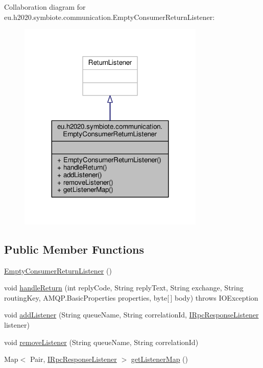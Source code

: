 Collaboration diagram for eu.\+h2020.\+symbiote.\+communication.\+Empty\+Consumer\+Return\+Listener\+:
\nopagebreak
\begin{figure}[H]
\begin{center}
\leavevmode
\includegraphics[width=251pt]{classeu_1_1h2020_1_1symbiote_1_1communication_1_1EmptyConsumerReturnListener__coll__graph}
\end{center}
\end{figure}
\subsection*{Public Member Functions}
\begin{DoxyCompactItemize}
\item 
\hyperlink{classeu_1_1h2020_1_1symbiote_1_1communication_1_1EmptyConsumerReturnListener_a9ec79d1d093e2380bf03fa1f76ce2261}{Empty\+Consumer\+Return\+Listener} ()
\item 
void \hyperlink{classeu_1_1h2020_1_1symbiote_1_1communication_1_1EmptyConsumerReturnListener_a612cd000e7188e6f05091e3f3673fb1d}{handle\+Return} (int reply\+Code, String reply\+Text, String exchange, String routing\+Key, A\+M\+Q\+P.\+Basic\+Properties properties, byte\mbox{[}$\,$\mbox{]} body)  throws I\+O\+Exception 
\item 
void \hyperlink{classeu_1_1h2020_1_1symbiote_1_1communication_1_1EmptyConsumerReturnListener_aaa1b35e4c336a029f118a19b9162e812}{add\+Listener} (String queue\+Name, String correlation\+Id, \hyperlink{interfaceeu_1_1h2020_1_1symbiote_1_1communication_1_1IRpcResponseListener}{I\+Rpc\+Response\+Listener} listener)
\item 
void \hyperlink{classeu_1_1h2020_1_1symbiote_1_1communication_1_1EmptyConsumerReturnListener_a89ad674c17d6304781ed91117aac0153}{remove\+Listener} (String queue\+Name, String correlation\+Id)
\item 
Map$<$ Pair, \hyperlink{interfaceeu_1_1h2020_1_1symbiote_1_1communication_1_1IRpcResponseListener}{I\+Rpc\+Response\+Listener} $>$ \hyperlink{classeu_1_1h2020_1_1symbiote_1_1communication_1_1EmptyConsumerReturnListener_afc62e8333afe576bc3a211195f7ade06}{get\+Listener\+Map} ()
\end{DoxyCompactItemize}



